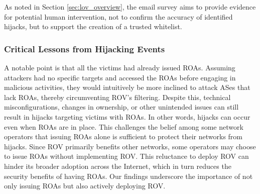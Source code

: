 As noted in Section \ref{sec:lov_overview}, the email survey aims to provide evidence for potential human intervention, not to confirm the accuracy of identified hijacks, but to support the creation of a trusted whitelist.
\vspace{-5pt}
\subsubsection{Critical Lessons from Hijacking Events}
A notable point is that all the victims had already issued ROAs. Assuming attackers had no specific targets and accessed the ROAs before engaging in malicious activities, they would intuitively be more inclined to attack ASes that lack ROAs, thereby circumventing ROV's filtering. Despite this, technical misconfigurations, changes in ownership, or other unintended issues can still result in hijacks targeting victims with ROAs.
In other words, hijacks can occur even when ROAs are in place. This challenges the belief among some network operators that issuing ROAs alone is sufficient to protect their networks from hijacks. Since ROV primarily benefits other networks, some operators may choose to issue ROAs without implementing ROV. This reluctance to deploy ROV can hinder its broader adoption across the Internet, which in turn reduces the security benefits of having ROAs. Our findings underscore the importance of not only issuing ROAs but also actively deploying ROV.











 
 












